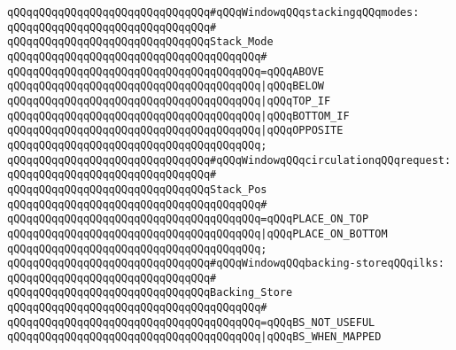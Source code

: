 \newline
\verb|qQQqqQQqqQQqqQQqqQQqqQQqqQQqqQQq#qQQqWindowqQQqstackingqQQqmodes:|\newline
\verb|qQQqqQQqqQQqqQQqqQQqqQQqqQQqqQQq#|\newline
\verb|qQQqqQQqqQQqqQQqqQQqqQQqqQQqqQQqStack_Mode|\newline
\verb|qQQqqQQqqQQqqQQqqQQqqQQqqQQqqQQqqQQqqQQq#|\newline
\verb|qQQqqQQqqQQqqQQqqQQqqQQqqQQqqQQqqQQqqQQq=qQQqABOVE|\newline
\verb|qQQqqQQqqQQqqQQqqQQqqQQqqQQqqQQqqQQqqQQq|\verb#|qQQqBELOW#\newline
\verb|qQQqqQQqqQQqqQQqqQQqqQQqqQQqqQQqqQQqqQQq|\verb#|qQQqTOP_IF#\newline
\verb|qQQqqQQqqQQqqQQqqQQqqQQqqQQqqQQqqQQqqQQq|\verb#|qQQqBOTTOM_IF#\newline
\verb|qQQqqQQqqQQqqQQqqQQqqQQqqQQqqQQqqQQqqQQq|\verb#|qQQqOPPOSITE#\newline
\verb|qQQqqQQqqQQqqQQqqQQqqQQqqQQqqQQqqQQqqQQq;|\newline
\newline
\verb|qQQqqQQqqQQqqQQqqQQqqQQqqQQqqQQq#qQQqWindowqQQqcirculationqQQqrequest:|\newline
\verb|qQQqqQQqqQQqqQQqqQQqqQQqqQQqqQQq#|\newline
\verb|qQQqqQQqqQQqqQQqqQQqqQQqqQQqqQQqStack_Pos|\newline
\verb|qQQqqQQqqQQqqQQqqQQqqQQqqQQqqQQqqQQqqQQq#|\newline
\verb|qQQqqQQqqQQqqQQqqQQqqQQqqQQqqQQqqQQqqQQq=qQQqPLACE_ON_TOP|\newline
\verb|qQQqqQQqqQQqqQQqqQQqqQQqqQQqqQQqqQQqqQQq|\verb#|qQQqPLACE_ON_BOTTOM#\newline
\verb|qQQqqQQqqQQqqQQqqQQqqQQqqQQqqQQqqQQqqQQq;|\newline
\newline
\verb|qQQqqQQqqQQqqQQqqQQqqQQqqQQqqQQq#qQQqWindowqQQqbacking-storeqQQqilks:|\newline
\verb|qQQqqQQqqQQqqQQqqQQqqQQqqQQqqQQq#|\newline
\verb|qQQqqQQqqQQqqQQqqQQqqQQqqQQqqQQqBacking_Store|\newline
\verb|qQQqqQQqqQQqqQQqqQQqqQQqqQQqqQQqqQQqqQQq#|\newline
\verb|qQQqqQQqqQQqqQQqqQQqqQQqqQQqqQQqqQQqqQQq=qQQqBS_NOT_USEFUL|\newline
\verb|qQQqqQQqqQQqqQQqqQQqqQQqqQQqqQQqqQQqqQQq|\verb#|qQQqBS_WHEN_MAPPED#\newline
